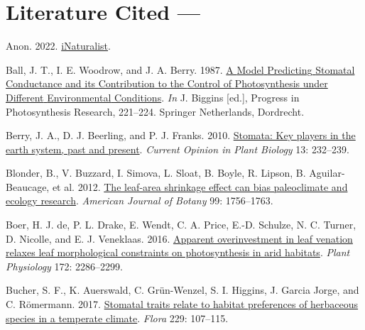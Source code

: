 \documentclass[
  letterpaper,
  DIV=11,
  numbers=noendperiod]{scrartcl}
\newlength{\cslhangindent}
\newlength{\cslentryspacingunit} %
\newenvironment{CSLReferences}[2] %
 {%
  \setlength{\parindent}{0pt}
  \ifodd #1
  \let\oldpar\par
  \def\par{\hangindent=\cslhangindent\oldpar}
  \fi
  \setlength{\parskip}{#2\cslentryspacingunit}
 }%
 {}
\begin{document}
\newpage

\hypertarget{literature-cited}{%
\section*{Literature Cited ---}\label{literature-cited}}

\hypertarget{refs}{}
\begin{CSLReferences}{1}{0}
\leavevmode{}%
Anon. 2022. \href{https://www.inaturalist.org}{{iNaturalist}}.

\leavevmode{}%
Ball, J. T., I. E. Woodrow, and J. A. Berry. 1987.
\href{https://doi.org/10.1007/978-94-017-0519-6_48}{A {Model}
{Predicting} {Stomatal} {Conductance} and its {Contribution} to the
{Control} of {Photosynthesis} under {Different} {Environmental}
{Conditions}}. \emph{In} J. Biggins {[}ed.{]}, Progress in
{Photosynthesis} {Research}, 221--224. Springer Netherlands, Dordrecht.

\leavevmode{}%
Berry, J. A., D. J. Beerling, and P. J. Franks. 2010.
\href{https://doi.org/10.1016/j.pbi.2010.04.013}{Stomata: Key players in
the earth system, past and present}. \emph{Current Opinion in Plant
Biology} 13: 232--239.

\leavevmode{}%
Blonder, B., V. Buzzard, I. Simova, L. Sloat, B. Boyle, R. Lipson, B.
Aguilar-Beaucage, et al. 2012.
\href{https://doi.org/10.3732/ajb.1200062}{The leaf-area shrinkage
effect can bias paleoclimate and ecology research}. \emph{American
Journal of Botany} 99: 1756--1763.

\leavevmode{}%
Boer, H. J. de, P. L. Drake, E. Wendt, C. A. Price, E.-D. Schulze, N. C.
Turner, D. Nicolle, and E. J. Veneklaas. 2016.
\href{https://doi.org/10.1104/pp.16.01313}{Apparent overinvestment in
leaf venation relaxes leaf morphological constraints on photosynthesis
in arid habitats}. \emph{Plant Physiology} 172: 2286--2299.

\leavevmode{}%
Bucher, S. F., K. Auerswald, C. Grün-Wenzel, S. I. Higgins, J. Garcia
Jorge, and C. Römermann. 2017.
\href{https://doi.org/10.1016/j.flora.2017.02.011}{Stomatal traits
relate to habitat preferences of herbaceous species in a temperate
climate}. \emph{Flora} 229: 107--115.


\end{CSLReferences}
\end{document}
